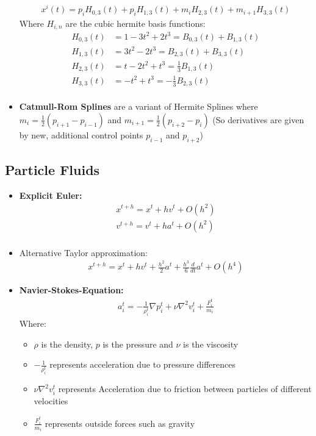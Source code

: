 \documentclass{scrartcl}
\begin{document}
\begin{itemize}
\begin{align*}
        x^i(t) = p_iH_{0,3}(t)+p_iH_{1,3}(t) + m_iH_{2,3}(t) + m_{i+1}H_{3,3}(t)
    \end{align*}
    Where $H_{i,n}$ are the cubic hermite basis functions:
    \begin{align*}
        H_{0,3}(t) &= 1 - 3t^2 + 2t^3 = B_{0,3}(t) + B_{1,3}(t)\\
        H_{1,3}(t) &= 3t^2 - 2t^3 = B_{2,3}(t) + B_{3,3}(t)\\
        H_{2,3}(t) &= t - 2t^2 + t^3 = \frac{1}{3}B_{1,3}(t)\\
        H_{3,3}(t) &= -t^2 + t^3 = -\frac{1}{3}B_{2,3}(t)\\
    \end{align*}
    \item \textbf{Catmull-Rom Splines} are a variant of Hermite Splines where $m_i = \frac{1}{2}(p_{i+1} - p_{i-1})$ and $m_{i+1} = \frac{1}{2}(p_{i+2} - p_{i})$ (So derivatives are given by new, additional control points $p_{i-1}$ and $p_{i+2}$)
\end{itemize}
\subsection*{Particle Fluids}
\begin{itemize}
    \item \textbf{Explicit Euler:} 
    \begin{align*}
        x^{t+h} = x^t + hv^t + O(h^2)\\
        v^{t+h} = v^t + ha^t + O(h^2)\\
    \end{align*}
    \item Alternative Taylor approximation:
    \begin{align*}
        x^{t+h} = x^t + hv^t  + \frac{h^2}{2}a^t + \frac{h^3}{6}\frac{d}{dt}a^t + O(h^4)
    \end{align*}
    \item \textbf{Navier-Stokes-Equation:}
    \begin{align*}
        a_i^t = -\frac{1}{\rho_i^t}\nabla p_i^t + \nu\nabla^2 v_i^t + \frac{F_i^t}{m_i}
    \end{align*}
    Where:
    \begin{itemize}
        \item $\rho$ is the density, $p$ is the pressure and $\nu$ is the viscosity
        \item $-\frac{1}{\rho_i^t}$ represents acceleration due to pressure differences
        \item $\nu\nabla^2 v_i^t$ represents Acceleration due to friction between particles of different velocities
        \item $\frac{F_i^t}{m_i}$ represents outside forces such as gravity
    \end{itemize}
\end{itemize}
\end{document}
